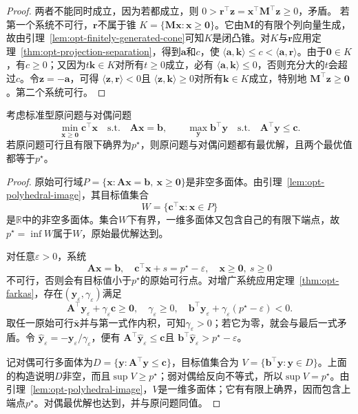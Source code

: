\begin{proof}
两者不能同时成立，因为若都成立，则
$0>\bm r^\top\bm z=\bm x^\top\bm M^\top\bm z\geq0$，矛盾。
若第一个系统不可行，$\bm r$不属于锥
$K=\{\bm M\bm x:\bm x\geq\bm0\}$。它由$\bm M$的有限个列向量生成，故由引理~\ref{lem:opt-finitely-generated-cone}可知$K$是闭凸锥。对$K$与$\bm r$应用定理~\ref{thm:opt-projection-separation}，得到$\bm a$和$c$，使
$\langle\bm a,\bm k\rangle\leq c<\langle\bm a,\bm r\rangle$。由于$\bm0\in K$，有$c\geq0$；又因为$t\bm k\in K$对所有$t\geq0$成立，必有
$\langle\bm a,\bm k\rangle\leq0$，否则充分大的$t$会超过$c$。令$\bm z=-\bm a$，可得
$\langle\bm z,\bm r\rangle<0$且
$\langle\bm z,\bm k\rangle\geq0$对所有$\bm k\in K$成立，特别地
$\bm M^\top\bm z\geq\bm0$。第二个系统可行。
\end{proof}

\begin{theorem}[有限维线性规划强对偶]
\label{thm:opt-lp-strong-duality}
考虑标准型原问题与对偶问题
\[
 \min_{\bm x\geq\bm0}\bm c^\top\bm x
 \quad\text{s.t.}\quad\bm A\bm x=\bm b,
 \qquad
 \max_{\bm y}\bm b^\top\bm y
 \quad\text{s.t.}\quad\bm A^\top\bm y\leq\bm c.
\]
若原问题可行且有限下确界为$p^\star$，则原问题与对偶问题都有最优解，且两个最优值都等于$p^\star$。
\end{theorem}

\begin{proof}
原始可行域$P=\{\bm x:\bm A\bm x=\bm b,\ \bm x\geq\bm0\}$是非空多面体。由引理~\ref{lem:opt-polyhedral-image}，其目标值集合
\[
 W=\{\bm c^\top\bm x:\bm x\in P\}
\]
是$\mathbb R$中的非空多面体。集合$W$下有界，一维多面体又包含自己的有限下端点，故$p^\star=\inf W$属于$W$，原始最优解达到。

对任意$\varepsilon>0$，系统
\[
 \bm A\bm x=\bm b,\quad
 \bm c^\top\bm x+s=p^\star-\varepsilon,\quad
 \bm x\geq\bm0,\ s\geq0
\]
不可行，否则会有目标值小于$p^\star$的原始可行点。对增广系统应用定理~\ref{thm:opt-farkas}，存在$(\bm y_\varepsilon,\gamma_\varepsilon)$满足
\[
 \bm A^\top\bm y_\varepsilon+\gamma_\varepsilon\bm c\geq\bm0,
 \quad\gamma_\varepsilon\geq0,
 \quad\bm b^\top\bm y_\varepsilon
 +\gamma_\varepsilon(p^\star-\varepsilon)<0.
\]
取任一原始可行$\bar{\bm x}$并与第一式作内积，可知$\gamma_\varepsilon>0$；若它为零，就会与最后一式矛盾。令
$\widehat{\bm y}_\varepsilon=-\bm y_\varepsilon/\gamma_\varepsilon$，便有
$\bm A^\top\widehat{\bm y}_\varepsilon\leq\bm c$且
$\bm b^\top\widehat{\bm y}_\varepsilon>p^\star-\varepsilon$。

记对偶可行多面体为$D=\{\bm y:\bm A^\top\bm y\leq\bm c\}$，目标值集合为
$V=\{\bm b^\top\bm y:\bm y\in D\}$。上面的构造说明$D$非空，而且$\sup V\geq p^\star$；弱对偶给反向不等式，所以$\sup V=p^\star$。由引理~\ref{lem:opt-polyhedral-image}，$V$是一维多面体；它有有限上确界，因而包含上端点$p^\star$。对偶最优解也达到，并与原问题同值。
\end{proof}

